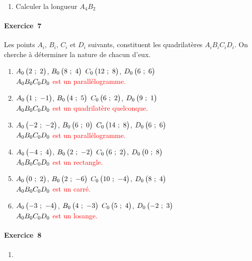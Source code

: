 \documentclass[a4paper,12pt,twocolumn,landscape]{article}
\newcommand{\quadrilatere}[9]{$\pointcoord{A_{\theenumi}}{#1}{#2}$, $\pointcoord{B_\theenumi}{#3}{#4}$ $\pointcoord{C_{\theenumi}}{#5}{#6}$, $\pointcoord{D_\theenumi}{#7}{#8}$ \\ \textcolor{red}{$A_{\theenumi}B_{\theenumi}C_{\theenumi}D_{\theenumi}$ est un #9.}}
\begin{document}
\begin{minipage}{0.45\textwidth}
\begin{enumerate}
	\item Calculer la longueur $A_4B_2$
\end{enumerate}
%
%
%
%
%

\vspace{-2em}

\end{minipage}
\newpage
\begin{minipage}{0.45\textwidth}
\thispagestyle{firststyle}

\vspace*{1em}

\paragraph{Exercice~7} Les points $A_i$, $B_i$, $C_i$ et $D_i$ suivants, constituent les quadrilatères $A_iB_iC_iD_i$. On cherche à déterminer la nature de chacun d'eux.

\begin{enumerate}
	\item \quadrilatere{2}{2}{8}{4}{12}{8}{6}{6}{parallélogramme}
	\item \quadrilatere{1}{-1}{4}{5}{6}{2}{9}{1}{quadrilatère quelconque}
	\item \quadrilatere{-2}{-2}{6}{0}{14}{8}{6}{6}{parallélogramme}
	\item \quadrilatere{-4}{4}{2}{-2}{6}{2}{0}{8}{rectangle}
	\item \quadrilatere{0}{2}{2}{-6}{10}{-4}{8}{4}{carré}
	\item \quadrilatere{-3}{-4}{4}{-3}{5}{4}{-2}{3}{losange}
\end{enumerate}


\paragraph{Exercice~8} 

\begin{enumerate}
	\item 
\end{enumerate}

\vspace{-2em}

\end{minipage}
\end{document}
